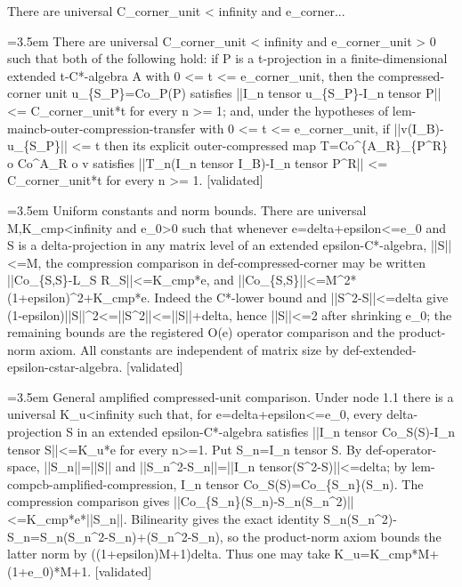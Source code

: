 \documentclass{article}
\newcommand{\step}[1]{\par\noindent\hangindent=3.5em\hangafter=1%
  \makebox[3.5em][l]{\textbf{#1.}}}
\newcommand{\steptag}[1]{\hfill{\small\textsf{[#1]}}}
\begin{document}
\begin{proofbox}{There are universal C\_corner\_unit < infinity and e\_corner...}
\step{1} There are universal C\_corner\_unit < infinity and e\_corner\_unit > 0 such that both of the following hold: if P is a t-projection in a finite-dimensional extended t-C*-algebra A with 0 <= t <= e\_corner\_unit, then the compressed-corner unit u\_\{S\_P\}=Co\_P(P) satisfies ||I\_n tensor u\_\{S\_P\}-I\_n tensor P|| <= C\_corner\_unit*t for every n >= 1; and, under the hypotheses of lem-maincb-outer-compression-transfer with 0 <= t <= e\_corner\_unit, if ||v(I\_B)-u\_\{S\_P\}|| <= t then its explicit outer-compressed map T=Co\textasciicircum{}\{A\_R\}\_\{P\textasciicircum{}R\} o Co\textasciicircum{}A\_R o v satisfies ||T\_n(I\_n tensor I\_B)-I\_n tensor P\textasciicircum{}R|| <= C\_corner\_unit*t for every n >= 1. \steptag{validated} \\[6pt]
\step{1.1} Uniform constants and norm bounds. There are universal M,K\_cmp<infinity and e\_0>0 such that whenever e=delta+epsilon<=e\_0 and S is a delta-projection in any matrix level of an extended epsilon-C*-algebra, ||S||<=M, the compression comparison in def-compressed-corner may be written ||Co\_\{S,S\}-L\_S R\_S||<=K\_cmp*e, and ||Co\_\{S,S\}||<=M\textasciicircum{}2*(1+epsilon)\textasciicircum{}2+K\_cmp*e. Indeed the C*-lower bound and ||S\textasciicircum{}2-S||<=delta give (1-epsilon)||S||\textasciicircum{}2<=||S\textasciicircum{}2||<=||S||+delta, hence ||S||<=2 after shrinking e\_0; the remaining bounds are the registered O(e) operator comparison and the product-norm axiom. All constants are independent of matrix size by def-extended-epsilon-cstar-algebra. \steptag{validated} \\[4pt]
\step{1.2} General amplified compressed-unit comparison. Under node 1.1 there is a universal K\_u<infinity such that, for e=delta+epsilon<=e\_0, every delta-projection S in an extended epsilon-C*-algebra satisfies ||I\_n tensor Co\_S(S)-I\_n tensor S||<=K\_u*e for every n>=1. Put S\_n=I\_n tensor S. By def-operator-space, ||S\_n||=||S|| and ||S\_n\textasciicircum{}2-S\_n||=||I\_n tensor(S\textasciicircum{}2-S)||<=delta; by lem-compcb-amplified-compression, I\_n tensor Co\_S(S)=Co\_\{S\_n\}(S\_n). The compression comparison gives ||Co\_\{S\_n\}(S\_n)-S\_n(S\_n\textasciicircum{}2)||<=K\_cmp*e*||S\_n||. Bilinearity gives the exact identity S\_n(S\_n\textasciicircum{}2)-S\_n=S\_n(S\_n\textasciicircum{}2-S\_n)+(S\_n\textasciicircum{}2-S\_n), so the product-norm axiom bounds the latter norm by ((1+epsilon)M+1)delta. Thus one may take K\_u=K\_cmp*M+(1+e\_0)*M+1. \steptag{validated} \\[4pt]

\end{proofbox}
\end{document}
